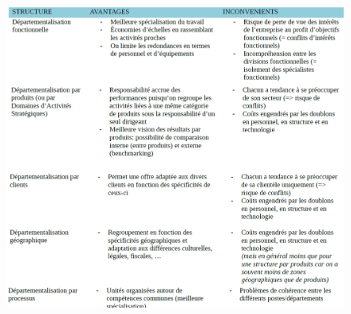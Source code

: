 \documentclass[letterpaper, 12pt]{article}
\begin{document}
			\begin{figure}[H]
				\centering
				\includegraphics[scale=0.6]{Images/departementalisation1}
			\end{figure}
\end{document}
